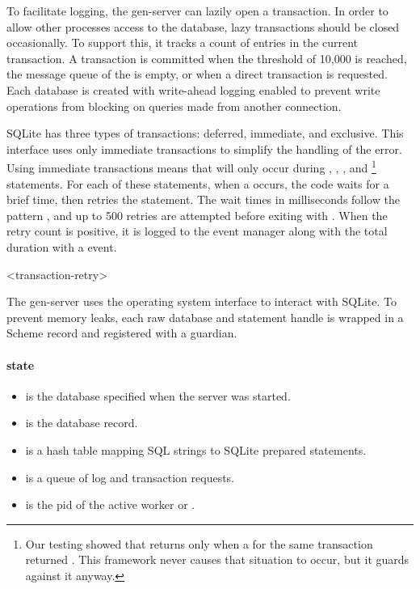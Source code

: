 To facilitate logging, the  gen-server can lazily open a
transaction. In order to allow other processes access to the database,
lazy transactions should be closed occasionally. To support this, it
tracks a count of entries in the current transaction. A transaction is
committed when the threshold of 10,000 is reached, the message queue
of the  is empty, or when a direct transaction is
requested.  Each database is created with write-ahead logging enabled
to prevent write operations from blocking on queries made from another
connection.

SQLite has three types of transactions: deferred, immediate, and
exclusive. This interface uses only immediate transactions to simplify
the handling of the  error.  Using immediate
transactions means that  will only occur during
, , ,
and \footnote{Our testing showed that
   returns  only when a
   for the same transaction returned
  . This framework never causes that situation to
  occur, but it guards against it anyway.} statements. For each of
these statements, when a  occurs, the code waits
for a brief time, then retries the statement. The wait times in
milliseconds follow the pattern , and up to 500 retries are attempted before
exiting with .  When
the retry count is positive, it is logged to the event manager along
with the total duration with a  event.

\begin{pubevent}{<transaction-retry>}
\end{pubevent}

The  gen-server uses the operating system interface to
interact with SQLite. To prevent memory leaks, each raw database and
statement handle is wrapped in a Scheme record and registered with a
guardian.

\paragraph* {state}
\begin{itemize}
\item {} is the database specified when the server was
  started.
\item {} is the database record.
\item {} is a hash table mapping SQL strings to SQLite
  prepared statements.
\item {} is a queue of log and transaction requests.
\item {} is the pid of the active worker or .
\end{itemize}

